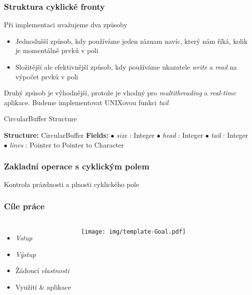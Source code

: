 \documentclass[]{fitthesispresn}
\begin{document}
    \begin{frame}
        \frametitle{Struktura cyklické fronty}
        Při implementaci uvažujeme dva způsoby
        \begin{itemize}
            \item Jednodušší způsob, kdy používáme jeden záznam navíc, který nám říká, kolik je momentálně prvků v poli
            \item Složitější ale efektivnější způsob, kdy používáme ukazatele \emph{write} a \emph{read} na výpočet prvků v poli
        \end{itemize}
        Druhý způsob je výhodnější, protože je vhodný pro \emph{multithreading} a \emph{real-time} aplikace. Budeme implementovat UNIXovou funkci \emph{tail}
        \begin{algorithm}[H]
        \caption{CircularBuffer Structure}
        \label{alg:circularbuffer}
        \begin{algorithmic}[1]
            \State \textbf{Structure:} CircularBuffer
            \State \textbf{Fields:}
            \State \hspace{\algorithmicindent} $\bullet$ \textit{size} : Integer
            \State \hspace{\algorithmicindent} $\bullet$ \textit{head} : Integer
            \State \hspace{\algorithmicindent} $\bullet$ \textit{tail} : Integer
            \State \hspace{\algorithmicindent} $\bullet$ \textit{lines} : Pointer to Pointer to Character
        \end{algorithmic}
        \end{algorithm}
    \end{frame}

    \begin{frame}
        \frametitle{Zakladní operace s cyklickým polem}
        Kontrola prázdnosti a plnosti cyklického pole
    \end{frame}




    \begin{frame}
        \frametitle{Cíle práce}
        \begin{columns}
            \begin{itemize}
                \item \emph{Vstup}
                \item \emph{Výstup}
                \item Žádoucí \emph{vlastnosti}
                \item Využití \& aplikace
            \end{itemize}

            \texttt{[image: img/template-Goal.pdf]}
        \end{columns}
    \end{frame}
\end{document}
